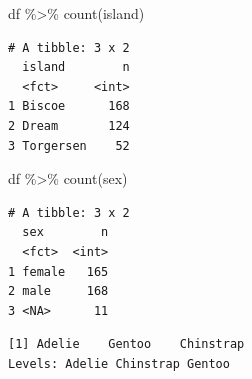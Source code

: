 \documentclass[
  spanish,
  11pt,
  a4paper,
  DIV=11,
  numbers=noendperiod]{scrartcl}
\newenvironment{Shaded}{\begin{snugshade}}{\end{snugshade}}
\newcommand{\AttributeTok}[1]{\textcolor[rgb]{0.40,0.45,0.13}{#1}}
\newcommand{\CommentTok}[1]{\textcolor[rgb]{0.37,0.37,0.37}{#1}}
\newcommand{\FunctionTok}[1]{\textcolor[rgb]{0.28,0.35,0.67}{#1}}
\newcommand{\NormalTok}[1]{\textcolor[rgb]{0.00,0.23,0.31}{#1}}
\newcommand{\OtherTok}[1]{\textcolor[rgb]{0.00,0.23,0.31}{#1}}
\newcommand{\SpecialCharTok}[1]{\textcolor[rgb]{0.37,0.37,0.37}{#1}}
\begin{document}
\begin{Shaded}
\begin{Highlighting}[numbers=left,,]
\NormalTok{df }\SpecialCharTok{\%\textgreater{}\%} \FunctionTok{count}\NormalTok{(island)}
\end{Highlighting}
\end{Shaded}

\begin{verbatim}
# A tibble: 3 x 2
  island        n
  <fct>     <int>
1 Biscoe      168
2 Dream       124
3 Torgersen    52
\end{verbatim}

\begin{Shaded}
\begin{Highlighting}[numbers=left,,]
\NormalTok{df }\SpecialCharTok{\%\textgreater{}\%} \FunctionTok{count}\NormalTok{(sex)}
\end{Highlighting}
\end{Shaded}

\begin{verbatim}
# A tibble: 3 x 2
  sex        n
  <fct>  <int>
1 female   165
2 male     168
3 <NA>      11
\end{verbatim}

\begin{Shaded}
\end{Shaded}

\begin{verbatim}
[1] Adelie    Gentoo    Chinstrap
Levels: Adelie Chinstrap Gentoo
\end{verbatim}

\begin{Shaded}
\end{Shaded}
\end{document}
